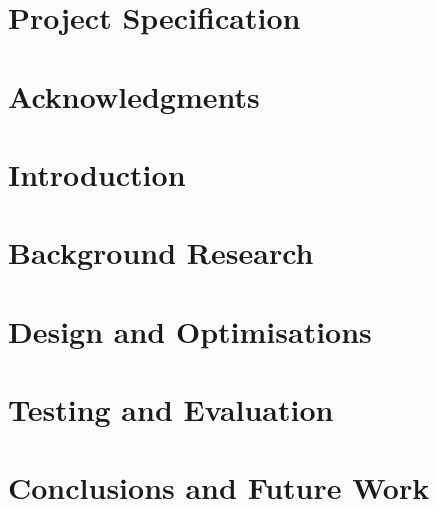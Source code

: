 \documentclass[]{UCD_CS_FYP_Report}
\begin{document}
\maketitle


\chapter*{Project Specification}



\begin{abstract}
	
\end{abstract}
\newpage


\chapter*{Acknowledgments}



\tableofcontents{}\newpage
\newpage


\chapter{Introduction}



\chapter{Background Research}


\chapter{Design and Optimisations}


\chapter{Testing and Evaluation}


\chapter{Conclusions and Future Work}


\newpage


\label{endpage}
\end{document}
